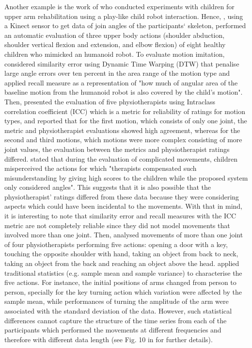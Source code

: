 Another example is the work of \cite{guneysu2014} who conducted experiments 
with children for upper 
arm rehabilitation using a play-like child robot interaction.
Hence, \cite{guneysu2014}, using a Kinect sensor to get data of join angles of 
the participants` skeleton, performed an automatic evaluation of three 
upper body actions (shoulder abduction, shoulder vertical flexion and 
extension, and elbow flexion) of eight healthy children who mimicked an 
humanoid robot. To evaluate motion imitation, \citealt[p. 202]{guneysu2014} 
considered similarity error using Dynamic Time Warping (DTW) that 
penalise large angle errors over ten percent in the area range of the 
motion type and applied recall measure as a representation of 
"how much of angular area of the baseline motion
from the humanoid robot is also covered by the child's motion".
Then, \cite{guneysu2014} presented the evaluation of five physiotherapists 
using Intraclass correlation coefficient (ICC) which is a metric for 
reliability of ratings for motion types, and reported that for the 
first motion, which consists of only one joint, the metric and 
physiotherapist evaluations showed high agreement, whereas for the 
second and third motions, which motions were more complex 
consisting of more joint values, the evaluation between the metrics 
and physiotherapist ratings differed.
\citealt[p. 203]{guneysu2014} stated that during the evaluation of complicated 
movements, children misperceived the actions for which "therapists
compensated such misunderstanding by giving high scores to the children
while the proposed system only considered angles".
This suggests that it is also possible that the physiotherapist' ratings 
differed from these data because they were considering aspects 
which could have been incidental to the movements.
With that in mind, it is interesting to note that 
similarity error and recall measures with the ICC metric are not 
completely reliable since 
they did not model movements that involved more than one joint.
Then, \cite{guneysu2015} analysed movements of more than one joint 
of four physiotherapists performing five actions: opening a door with a key, 
touching the opposite shoulder with hand, taking an object from back to neck, 
taking an object from the back and reaching an object above the head.
\cite{guneysu2015} applied traditional statistics 
(e.g. sample mean and sample variance) to characterise the five actions.
For instance, the  initial positions of arms changed from person to person, 
specially for the key turning action which variation were affected by the 
sample mean, while performances of turning the amplitude of the arm
were associated with the standard deviation of the data.
However, such statistical differences cannot capture the structure of the 
time series from each of the participants which performed the movements
at different frequencies and therefore with different data length
(see Fig. 10 in \cite{guneysu2015} for further details).

